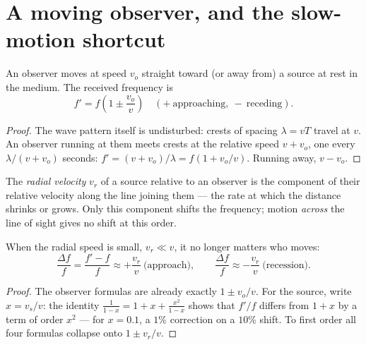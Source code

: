 \section{A moving observer, and the slow-motion shortcut}

\begin{proposition}\label{prop:g12:doppler-effect:moving-observer}
An observer moves at speed $v_o$ straight toward (or away from) a source at rest in the
medium. The received frequency is
\[ f' = f\left(1 \pm \frac{v_o}{v}\right) \quad (+\ \text{approaching},\ -\ \text{receding}). \]
\end{proposition}

\begin{proof}
The wave pattern itself is undisturbed: crests of spacing $\lambda = vT$ travel at $v$. An
observer running at them meets crests at the relative speed $v + v_o$, one every
$\lambda/(v + v_o)$ seconds: $f' = (v + v_o)/\lambda = f(1 + v_o/v)$. Running away, $v - v_o$.
\end{proof}

\begin{definition}\label{def:g12:doppler-effect:radial}
The \emph{radial velocity} $v_r$ of a source relative to an
observer is the component of their relative velocity along the line joining them --- the
rate at which the distance shrinks or grows. Only this component shifts the frequency;
motion \emph{across} the line of sight gives no shift at this order.
\end{definition}

\begin{proposition}\label{prop:g12:doppler-effect:slow}
When the radial speed is small, $v_r \ll v$, it no longer matters who moves:
\[
\frac{\Delta f}{f} = \frac{f' - f}{f} \approx +\frac{v_r}{v} \ \text{(approach)},
\qquad
\frac{\Delta f}{f} \approx -\frac{v_r}{v} \ \text{(recession)}.
\]
\end{proposition}

\begin{proof}
The observer formulas are already exactly $1 \pm v_o/v$. For the source, write $x = v_s/v$:
the identity $\frac{1}{1 - x} = 1 + x + \frac{x^2}{1 - x}$ shows that $f'/f$ differs from
$1 + x$ by a term of order $x^2$ --- for $x = 0.1$, a $1\%$ correction on a $10\%$ shift.
To first order all four formulas collapse onto $1 \pm v_r/v$.
\end{proof}

